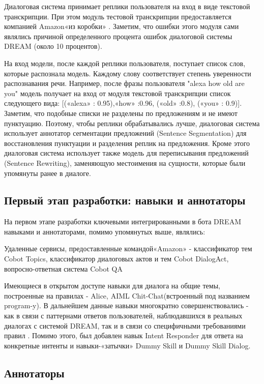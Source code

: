 Диалоговая система принимает реплики пользователя на вход в виде текстовой транскрипции. При этом модуль тестовой транскрипции предоставляется компанией Amazon«из коробки» . Заметим, что ошибки этого модуля сами являлись причиной определенного процента ошибок диалоговой системы DREAM (около 10 процентов).

На вход модели, после каждой реплики пользователя, поступает список слов, которые распознала модель. Каждому слову соответствует степень уверенности распознавания речи. Например, после фразы пользователя "alexa how old are you" модель получает на вход от модуля текстовой транскрипции список следующего вида: [(«alexa» : 0.95),«how» :0.96, («old» :0.8), («you» : 0.9)]. Заметим, что подобные списки не разделены по предложениям и не имеют пунктуацию. Поэтому, чтобы реплики обрабатывались лучше, диалоговая система использует аннотатор сегментации предложений (Sentence Segmentation) для восстановления пунктуации и разделения реплик на предложения. Кроме этого диалоговая система использует также модель для переписывания предложений (Sentence Rewriting), заменяющую местоимения на сущности, которые были упомянуты ранее в диалоге.


\subsection{Первый этап разработки: навыки и аннотаторы}

На первом этапе разработки ключевыми интегрированными в бота {DREAM} навыками и аннотаторами, помимо упомянутых выше, являлись:

Удаленные сервисы, предоставленные командой«Amazon» -  классификатор тем Cobot Topics, классификатор диалоговых актов и тем Cobot DialogAct, вопросно-ответная система Cobot QA

Имеющиеся в открытом доступе навыки для диалога на общие темы, построенные на правилах - Alice, AIML Chit-Chat(встроенный под названием program-y). В дальнейшем данные навыки многократно совершенствовались - как в связи с паттернами ответов пользователей, наблюдавшихся в реальных диалогах с системой DREAM, так и в связи со специфичными требованиями правил \cite{na_website_ndg}. Помимо этого, был добавлен навык Intent Responder для ответа на конкретные интенты и навыки-«затычки» Dummy Skill и Dummy Skill Dialog.

\subsection{Аннотаторы}

